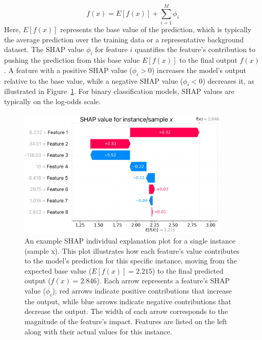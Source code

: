 \documentclass[12pt,a4paper]{report}
\begin{document}
$$ f(x) = E[f(x)] + \sum_{i=1}^M \phi_i $$
Here, $E[f(x)]$ represents the base value of the prediction, which is typically the average prediction over the training data or a representative background dataset. The SHAP value $\phi_i$ for feature $i$ quantifies the feature's contribution to pushing the prediction from this base value $E[f(x)]$ to the final output $f(x)$. A feature with a positive SHAP value ($\phi_i > 0$) increases the model's output relative to the base value, while a negative SHAP value ($\phi_i < 0$) decreases it, as illustrated in Figure~\ref{fig:SHAP-individual-explained}. For binary classification models, SHAP values are typically on the log-odds scale.\\
\begin{figure}[h!]
  \centering
  \includegraphics[width=0.9\textwidth]{images/SHAP-explained-individual.png}
  \caption[Example SHAP Individual Explanation Plot]{An example SHAP individual explanation plot for a single instance (sample x). This plot illustrates how each feature's value contributes to the model's prediction for this specific instance, moving from the expected base value ($E[f(x)] = 2.215$) to the final predicted output ($f(x) = 2.846$). Each arrow represents a feature's SHAP value ($\phi_i$); red arrows indicate positive contributions that increase the output, while blue arrows indicate negative contributions that decrease the output. The width of each arrow corresponds to the magnitude of the feature's impact. Features are listed on the left along with their actual values for this instance.}
  \label{fig:SHAP-individual-explained} %
\end{figure}
\end{document}

